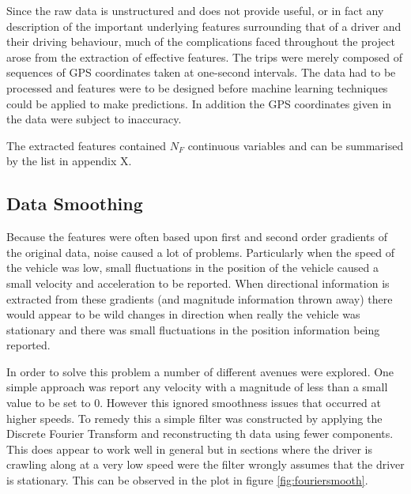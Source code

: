 \documentclass[a4paper, 11pt, twocolumn]{report}
\begin{document}
Since the raw data is unstructured and does not provide useful, or in fact any description of the important underlying features surrounding that of a driver and their driving behaviour, much of the complications faced throughout the project arose from the extraction of effective features.
The trips were merely composed of sequences of GPS coordinates taken at one-second intervals.
The data had to be processed and features were to be designed before machine learning techniques could be applied to make predictions.
In addition the GPS coordinates given in the data were subject to inaccuracy.

The extracted features contained $N_F$ continuous variables and can be summarised by the list in appendix X.


\subsection{Data Smoothing}
Because the features were often based upon first and second order gradients of the original data, noise caused a lot of problems.
Particularly when the speed of the vehicle was low, small fluctuations in the position of the vehicle caused a small velocity and acceleration to be reported.
When directional information is extracted from these gradients (and magnitude information thrown away) there would appear to be wild changes in direction when really the vehicle was stationary and there was small fluctuations in the position information being reported.

In order to solve this problem a number of different avenues were explored.
One simple approach was report any velocity with a magnitude of less than a small value to be set to 0.
However this ignored smoothness issues that occurred at higher speeds.
To remedy this a simple filter was constructed by applying the Discrete Fourier Transform and reconstructing th data using fewer components.
This does appear to work well in general but in sections where the driver is crawling along at a very low speed were the filter wrongly assumes that the driver is stationary.
This can be observed in the plot in figure \ref{fig:fouriersmooth}.
\end{document}
